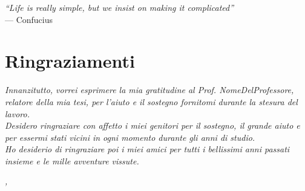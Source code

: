 
\cleardoublepage
{}
{}

\begin{flushright}{
	\slshape    
	``Life is really simple, but we insist on making it complicated''} \\ 
	\medskip
    --- Confucius
\end{flushright}


\bigskip

\begingroup
\let\clearpage\relax
\let\cleardoublepage\relax
\let\cleardoublepage\relax

\chapter*{Ringraziamenti}

\noindent \textit{Innanzitutto, vorrei esprimere la mia gratitudine al Prof. NomeDelProfessore, relatore della mia tesi, per l'aiuto e il sostegno fornitomi durante la stesura del lavoro.}\\

\noindent \textit{Desidero ringraziare con affetto i miei genitori per il sostegno, il grande aiuto e per essermi stati vicini in ogni momento durante gli anni di studio.}\\

\noindent \textit{Ho desiderio di ringraziare poi i miei amici per tutti i bellissimi anni passati insieme e le mille avventure vissute.}\\
\bigskip

\noindent\textit{\myLocation, \myTime}
\hfill \myName

\endgroup

